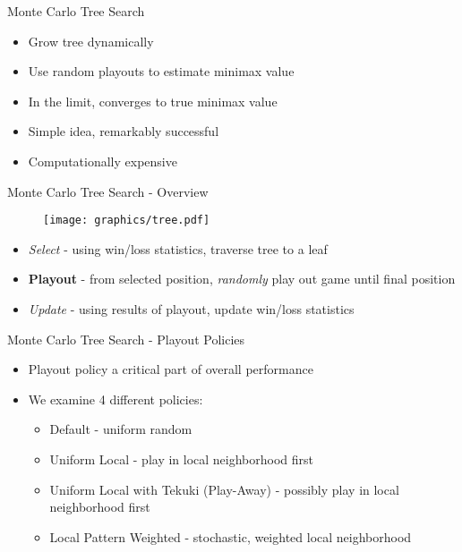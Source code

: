 \documentclass{beamer}
\begin{document}
\begin{frame}{Monte Carlo Tree Search}
\begin{itemize}
	\item Grow tree dynamically
	\item Use random playouts to estimate minimax value
	\item In the limit, converges to true minimax value
	\item Simple idea, remarkably successful
	\item Computationally expensive
\end{itemize}
\end{frame}

\begin{frame}{Monte Carlo Tree Search - Overview}
\begin{figure}
  \begin{center}
  \texttt{[image: graphics/tree.pdf]}
  \label{fig:encoding}
  \end{center}
\end{figure}
\begin{itemize}
	\item \emph{Select} - using win/loss statistics, traverse tree to a leaf
	\item {\bf Playout} - from selected position, \emph{randomly} play out game until final position
	\item \emph{Update} - using results of playout, update win/loss statistics
\end{itemize}
\end{frame}

\begin{frame}{Monte Carlo Tree Search - Playout Policies}
\begin{itemize}
	\item Playout policy a critical part of overall performance
	\item We examine 4 different policies:
	\begin{itemize}
		\item Default - uniform random
		\item Uniform Local - play in local neighborhood first
		\item Uniform Local with Tekuki (Play-Away) - possibly play in local neighborhood first
		\item Local Pattern Weighted - stochastic, weighted local neighborhood
	\end{itemize}
\end{itemize}
\end{frame}
\end{document}
